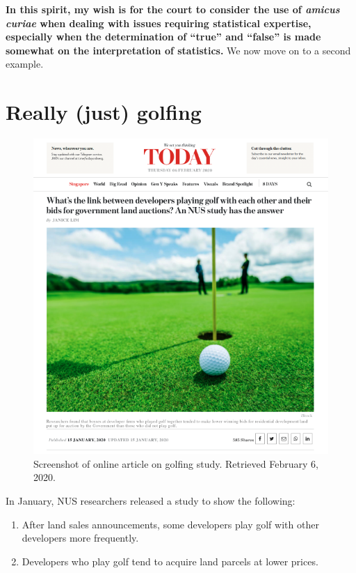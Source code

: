 \documentclass[openany]{book}
\providecommand{\tightlist}{%
  \setlength{\itemsep}{0pt}\setlength{\parskip}{0pt}}
\begin{document}
\textbf{In this spirit, my wish is for the court to consider the use of
\emph{amicus curiae} when dealing with issues requiring statistical
expertise, especially when the determination of ``true'' and ``false''
is made somewhat on the interpretation of statistics.} We now move on to
a second example.

\section{Really (just) golfing}\label{golfing}

\begin{figure}

{\centering \includegraphics[width=0.9\linewidth]{images/yousayisay/news2} 

}

\caption{Screenshot of online article on golfing study. Retrieved February 6, 2020.}\label{fig:today-golf}
\end{figure}

In January, NUS researchers released a study to show the following:

\begin{enumerate}
\def\labelenumi{\arabic{enumi}.}
\tightlist
\item
  After land sales announcements, some developers play golf with other
  developers more frequently.
\item
  Developers who play golf tend to acquire land parcels at lower prices.
\end{enumerate}
\end{document}
